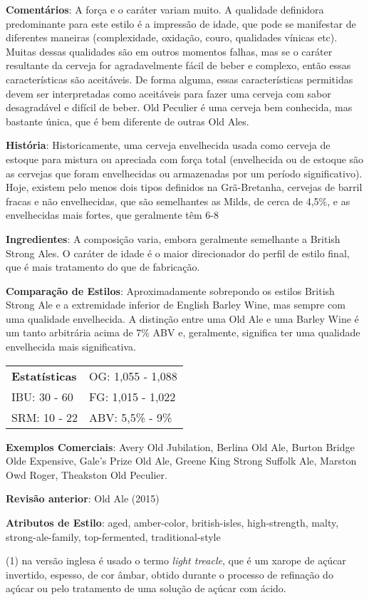 \textbf{Comentários}: A força e o caráter variam muito. A qualidade definidora predominante para este estilo é a impressão de idade, que pode se manifestar de diferentes maneiras (complexidade, oxidação, couro, qualidades vínicas etc). Muitas dessas qualidades são em outros momentos falhas, mas se o caráter resultante da cerveja for agradavelmente fácil de beber e complexo, então essas características são aceitáveis. De forma alguma, essas características permitidas devem ser interpretadas como aceitáveis para fazer uma cerveja com sabor desagradável e difícil de beber. Old Peculier é uma cerveja bem conhecida, mas bastante única, que é bem diferente de outras Old Ales.

\textbf{História}: Historicamente, uma cerveja envelhecida usada como cerveja de estoque para mistura ou apreciada com força total (envelhecida ou de estoque são as cervejas que foram envelhecidas ou armazenadas por um período significativo). Hoje, existem pelo menos dois tipos definidos na Grã-Bretanha, cervejas de barril fracas e não envelhecidas, que são semelhantes as Milds, de cerca de 4,5\%, e as envelhecidas mais fortes, que geralmente têm 6-8%

\textbf{Ingredientes}: A composição varia, embora geralmente semelhante a British Strong Ales. O caráter de idade é o maior direcionador do perfil de estilo final, que é mais tratamento do que de fabricação.

\textbf{Comparação de Estilos}: Aproximadamente sobrepondo os estilos British Strong Ale e a extremidade inferior de English Barley Wine, mas sempre com uma qualidade envelhecida. A distinção entre uma Old Ale e uma Barley Wine é um tanto arbitrária acima de 7\% ABV e, geralmente, significa ter uma qualidade envelhecida mais significativa.

\begin{tabular}{@{}p{35mm}p{35mm}@{}}
  \textbf{Estatísticas} & OG: 1,055 - 1,088 \\
  IBU: 30 - 60  & FG: 1,015 - 1,022  \\
  SRM: 10 - 22  & ABV: 5,5\% - 9\%
\end{tabular}

\textbf{Exemplos Comerciais}: Avery Old Jubilation, Berlina Old Ale, Burton Bridge Olde Expensive, Gale’s Prize Old Ale, Greene King Strong Suffolk Ale, Marston Owd Roger, Theakston Old Peculier.

\textbf{Revisão anterior}: Old Ale (2015)

\textbf{Atributos de Estilo}: aged, amber-color, british-isles, high-strength, malty, strong-ale-family, top-fermented, traditional-style

(1) na versão inglesa é usado o termo \textit{light treacle}, que é um xarope de açúcar invertido, espesso, de cor âmbar, obtido durante o processo de refinação do açúcar ou pelo tratamento de uma solução de açúcar com ácido.
